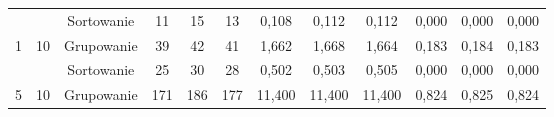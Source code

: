 \documentclass[magisterska]{pracamgr}
\begin{document}
\begin{table}[H]
{\begin{tabular}{@{}cccccccccccc@{}}
                                                                &                                                         & Sortowanie & 11                                                      & 15                                                      & 13                                                         & 0,108                                                      & 0,112                                                      & 0,112                                                          & 0,000                                                              & 0,000                                                               & 0,000                                                                  \\
1                                                               & 10                                                      & Grupowanie & 39                                                      & 42                                                      & 41                                                         & 1,662                                                      & 1,668                                                      & 1,664                                                          & 0,183                                                              & 0,184                                                               & 0,183                                                                  \\ \midrule
                                                                &                                                         & Sortowanie & 25                                                      & 30                                                      & 28                                                         & 0,502                                                      & 0,503                                                      & 0,505                                                          & 0,000                                                              & 0,000                                                               & 0,000                                                                  \\
5                                                               & 10                                                      & Grupowanie & 171                                                     & 186                                                     & 177                                                        & 11,400                                                     & 11,400                                                     & 11,400                                                         & 0,824                                                              & 0,825                                                               & 0,824                                                                  \\ \bottomrule
\end{tabular}%
}
\end{table}
\end{document}
